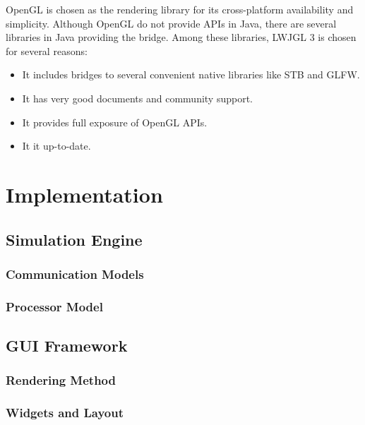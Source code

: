 \documentclass[msc,deptreport, cs]{infthesis}
\begin{document}
OpenGL is chosen as the rendering library for its cross-platform availability and simplicity. Although OpenGL do not provide APIs in Java, there are several libraries in Java providing the bridge. Among these libraries, LWJGL 3 is chosen for several reasons:

\begin{itemize}
  \vspace{-1em}\item It includes bridges to several convenient native libraries like STB and GLFW.
  \vspace{-1em}\item It has very good documents and community support.
  \vspace{-1em}\item It provides full exposure of OpenGL APIs.
  \vspace{-1em}\item It it up-to-date.
\end{itemize}

\chapter{Implementation}

\section{Simulation Engine}

\subsection{Communication Models}

\subsection{Processor Model}

\section{GUI Framework}

\subsection{Rendering Method}

\subsection{Widgets and Layout}
\end{document}
